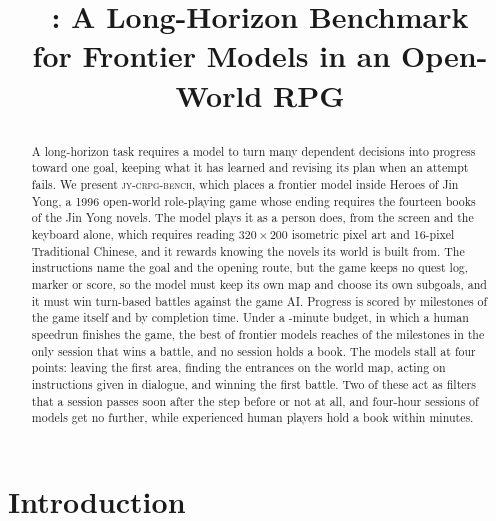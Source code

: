 \documentclass{article} %
\title{\raggedright\bench{}: A Long-Horizon Benchmark \\ for Frontier Models in an Open-World RPG}
\author{}
\newcommand{\bench}{\textsc{jy-crpg-bench}}
\begin{document}
\maketitle
\suppressfloats[t]




\begin{abstract}
A long-horizon task requires a model to turn many dependent decisions into
progress toward one goal, keeping what it has learned and revising its plan
when an attempt fails. We present \bench{}, which places a frontier model inside Heroes of Jin Yong, a 1996 open-world role-playing game whose ending requires the fourteen books of the Jin Yong novels. The model plays it as a person does, from the screen and the keyboard alone, which requires reading $320\times200$ isometric pixel art and 16-pixel Traditional Chinese, and it rewards knowing the novels its world is built from. The instructions name the goal and the opening route, but the game keeps no quest log, marker or score, so the model must keep its own map and choose its own subgoals, and it must win turn-based battles against the game AI. Progress is scored by milestones of the game itself and by completion time. Under a
\NbudgetMin{}-minute budget, in which a human speedrun finishes the game, the best of \NmodelsDistinct{} frontier models reaches \Ltop{} of the \Lrungs{} milestones in the only session that wins a battle, and no session holds a book. The models stall at four points: leaving the first area, finding the entrances on the world map, acting on instructions given in dialogue, and winning the first battle. Two of these act as filters that a session passes soon after the step before or not at all, and four-hour sessions of \NlongModels{} models get no further, while experienced human players hold a book within \LhumanBookLast{} minutes.
\end{abstract}

\section{Introduction}
\label{sec:intro}
\end{document}
